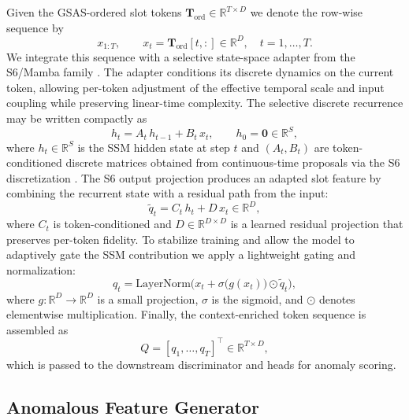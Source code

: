 Given the GSAS-ordered slot tokens \(\mathbf{T}_{\mathrm{ord}}\in\mathbb{R}^{T\times D}\) we denote the row-wise sequence by
\begin{equation}
x_{1:T},\qquad x_t=\mathbf{T}_{\mathrm{ord}}[t,:]\in\mathbb{R}^D,\quad t=1,\dots,T.
\end{equation}
We integrate this sequence with a selective state-space adapter from the S6/Mamba family \cite{gu2023mamba}. The adapter conditions its discrete dynamics on the current token, allowing per-token adjustment of the effective temporal scale and input coupling while preserving linear-time complexity. The selective discrete recurrence may be written compactly as
\begin{equation}
h_t = A_t\,h_{t-1} + B_t\,x_t,\qquad h_0=\mathbf{0}\in\mathbb{R}^S,
\end{equation}
where \(h_t\in\mathbb{R}^S\) is the SSM hidden state at step \(t\) and \((A_t,B_t)\) are token-conditioned discrete matrices obtained from continuous-time proposals via the S6 discretization \cite{gu2023mamba}. The S6 output projection produces an adapted slot feature by combining the recurrent state with a residual path from the input:
\begin{equation}
\tilde{q}_t = C_t\,h_t + D\,x_t \in\mathbb{R}^D,
\end{equation}
where \(C_t\) is token-conditioned and \(D\in\mathbb{R}^{D\times D}\) is a learned residual projection that preserves per-token fidelity. To stabilize training and allow the model to adaptively gate the SSM contribution we apply a lightweight gating and normalization:
\begin{equation}
q_t = \mathrm{LayerNorm}\!\Big( x_t + \sigma\big(g(x_t)\big)\odot \tilde{q}_t \Big),
\end{equation}
where \(g:\mathbb{R}^D\!\to\!\mathbb{R}^D\) is a small projection, \(\sigma\) is the sigmoid, and \(\odot\) denotes elementwise multiplication. Finally, the context-enriched token sequence is assembled as
\begin{equation}
Q = [q_1,\dots,q_T]^\top \in \mathbb{R}^{T\times D},
\end{equation}
which is passed to the downstream discriminator and heads for anomaly scoring. 

\subsection{Anomalous Feature Generator}

